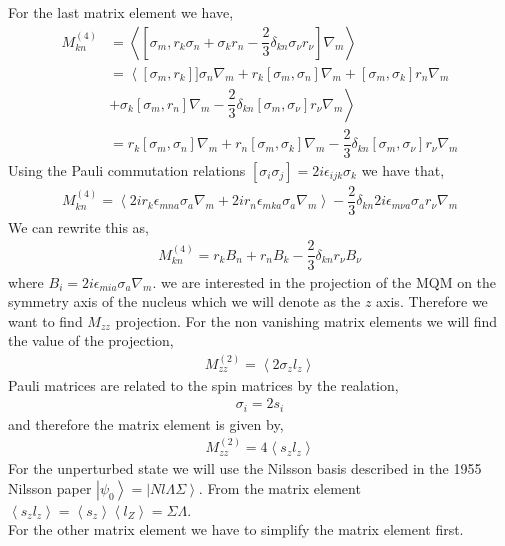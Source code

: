 \documentclass[10pt,a4paper, twoside]{report}
\begin{document}
For the last matrix element we have,
\begin{align*}
M^{(4)}_{kn} &= \left<\left[\sigma_m, r_k\sigma_n + \sigma_kr_n - \dfrac{2}{3}\delta_{kn}\sigma_{\nu}r_{\nu}\right] \nabla_m\right> \\
&= \left< \left[\sigma_m,r_k\right]]\sigma_n\nabla_m + r_k\left[\sigma_m,\sigma_n\right]\nabla_m + \left[\sigma_m,\sigma_k\right]r_n\nabla_m \right. \\ 
&\left. + \sigma_k\left[\sigma_m,r_n\right]\nabla_m - \dfrac{2}{3}\delta_{kn}\left[\sigma_m,\sigma_{\nu}\right]r_{\nu}\nabla_m\right> \\
&= r_k\left[\sigma_m,\sigma_n\right]\nabla_m + r_n \left[\sigma_m,\sigma_k\right]\nabla_m - \dfrac{2}{3}\delta_{kn}\left[\sigma_m,\sigma_{\nu}\right]r_{\nu}\nabla_{m}
\end{align*}
Using the Pauli commutation relations $\left[\sigma_i\sigma_j\right] = 2i\epsilon_{ijk}\sigma_k$ we have that,
\begin{align*}
M^{(4)}_{kn} = \left<2ir_k\epsilon_{mna}\sigma_a\nabla_m + 2ir_n\epsilon_{mka}\sigma_a\nabla_m\right> - \dfrac{2}{3}\delta_{kn}2i\epsilon_{m\nu a}\sigma_{a}r_{\nu}\nabla_{m}
\end{align*}
We can rewrite this as,
\begin{align*}
M^{(4)}_{kn} = r_kB_n + r_nB_k - \dfrac{2}{3}\delta_{kn}r_{\nu}B_{\nu}
\end{align*}
where $B_{i} = 2i\epsilon_{mia}\sigma_a\nabla_m$. we are interested in the projection of the MQM on the symmetry axis of the nucleus which we will denote as the $z$ axis. Therefore we want to find $M_{zz}$ projection. For the non vanishing matrix elements we will find the value of the projection,
\begin{align*}
M_{zz}^{(2)} = \left<2\sigma_zl_z\right>
\end{align*}
Pauli matrices are related to the spin matrices by the realation,
\begin{align*}
\sigma_i = 2s_i
\end{align*}
and therefore the matrix element is given by,
\begin{align*}
M_{zz}^{(2)} = 4\left<s_zl_z\right>
\end{align*}
For the unperturbed state we will use the Nilsson basis described in the 1955 Nilsson paper \cite{Nilsson1955} $\left|\psi_0\right> = \left|Nl\Lambda\Sigma\right>$. From \cite{Nilsson1955} the matrix element $\left<s_zl_z\right> = \left<s_z\right>\left<l_Z\right> = \Sigma\Lambda$. \\
For the other matrix element we have to simplify the matrix element first. \\
\end{document}
